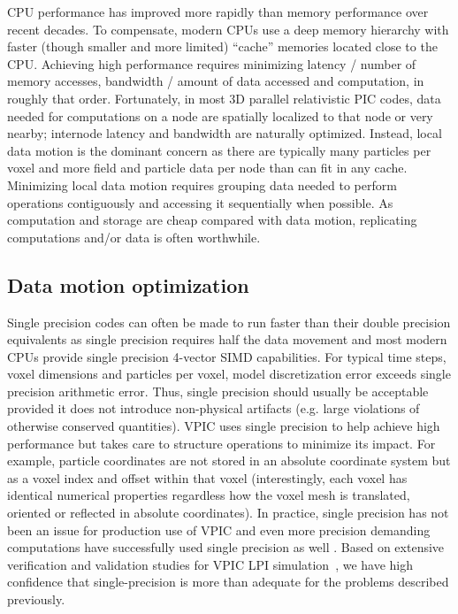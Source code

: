 \documentclass[journal,twoside]{IEEEtran}
\begin{document}
CPU performance has improved more rapidly than memory performance over
recent decades.  To compensate, modern CPUs use a deep memory
hierarchy with faster (though smaller and more limited) ``cache''
memories located close to the CPU.  Achieving high performance
requires minimizing latency / number of memory accesses, bandwidth /
amount of data accessed and computation, in roughly that order.
Fortunately, in most 3D parallel relativistic PIC codes, data needed
for computations on a node are spatially localized to that node or
very nearby; internode latency and bandwidth are naturally optimized.
Instead, local data motion is the dominant concern as there are
typically many particles per voxel and more field and particle data
per node than can fit in any cache.  Minimizing local data motion
requires grouping data needed to perform operations contiguously and
accessing it sequentially when possible.  As computation and storage
are cheap compared with data motion, replicating computations and/or
data is often worthwhile.

\subsection{Data motion optimization}

Single precision codes can often be made to run faster than their
double precision equivalents as single precision requires half the
data movement and most modern CPUs provide single precision 4-vector
SIMD capabilities.  For typical time steps, voxel dimensions and
particles per voxel, model discretization error exceeds single
precision arithmetic error.  Thus, single precision should usually be
acceptable provided it does not introduce non-physical artifacts
(e.g. large violations of otherwise conserved quantities).  VPIC uses
single precision to help achieve high performance but takes care to
structure operations to minimize its impact.  For example, particle
coordinates are not stored in an absolute coordinate system but as a
voxel index and offset within that voxel (interestingly, each voxel
has identical numerical properties regardless how the voxel mesh is
translated, oriented or reflected in absolute coordinates).  In
practice, single precision has not been an issue for production use of
VPIC and even more precision demanding computations have successfully
used single precision as well
\cite{Bowers_et_al_2006,Langou_et_al_2006,Lippert_et_al_2007}.
Based on extensive verification and validation studies for VPIC LPI
simulation~\cite{Yin_et_al_Phys_Plasmas_2006}, we have high confidence
that single-precision is more than adequate for the problems
described previously.
\end{document}
